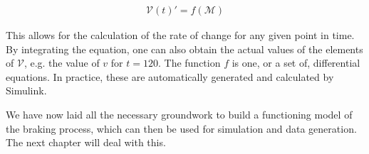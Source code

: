 \begin{align*}
{\mathcal{V}}(t)' = f ( {\mathcal{M}} )
\end{align*}

\noindent
This allows for the calculation of the rate of change for any given point in time. By integrating the equation, one can also obtain the actual values of the elements of ${\mathcal{V}}$, e.g. the value of $v$ for $t=120$. The function $f$ is one, or a set of, differential equations. In practice, these are automatically generated and calculated by Simulink.
\bigskip
\par\noindent
We have now laid all the necessary groundwork to build a functioning model of the braking process, which can then be used for simulation and data generation. The next chapter will deal with this.